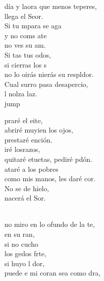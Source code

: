 \begin{cancion}%
	día y laora que menos teperes,\\
	llega el Seor. \\
	Si tu mpara se aga  \\
	y no coms ate\\
	no ves su am. \\
	Si tas tus odos, \\
	si cierras los s\\
	no lo oirás nierás su respldor.\\
	Cual surro pasa desapercio,\\
	l nolza laz.\\jump\\
	\begin{chorus}%
	praré el eite, \\
	abriré muyien los ojos, \\
	prestaré ención.\\
	iré losrazos, \\
	quitaré etuetas, pediré pdón.\\
	ataré a los pobres \\
	como mis manos, les daré cor.\\
	No se de hielo,  \\
	nacerá el Sor.\\
	\end{chorus}%
	\jump\\
	no miro en lo ofundo de la te, \\
	en su ran,\\
	si no cucho \\
	los gedos  frte,\\
	si huyo l dor,\\
	puede e mi coran sea como dra, \\

\end{cancion}
